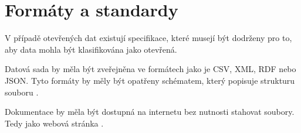\chapter{Formáty a standardy}
V případě otevřených dat existují specifikace, které musejí být dodrženy pro to, aby data mohla být klasifikována jako otevřená.

Datová sada by měla být zveřejněna ve formátech jako je CSV, XML, RDF nebo JSON. Tyto formáty by měly být opatřeny schématem, který popisuje strukturu souboru \parencite{PrikladySpatnePraxe2022}.

Dokumentace by měla být dostupná na internetu bez nutnosti stahovat soubory. Tedy jako webová stránka \parencite{DokumentaceCiPodminky2020}.

